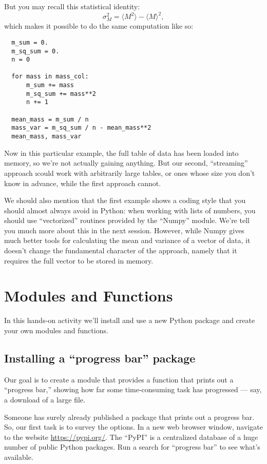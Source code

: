 \documentclass[letterpaper, 12pt, titlepage, twoside]{article}
\begin{document}
But you may recall this statistical identity:
\[
\sigma^2_M = \langle M^2\rangle - \langle M\rangle^2,
\]
which makes it possible to do the same computation like so:

\begin{lstlisting}
  m_sum = 0.
  m_sq_sum = 0.
  n = 0

  for mass in mass_col:
      m_sum += mass
      m_sq_sum += mass**2
      n += 1

  mean_mass = m_sum / n
  mass_var = m_sq_sum / n - mean_mass**2
  mean_mass, mass_var
\end{lstlisting}

Now in this particular example, the full table of data has been loaded into
memory, so we're not actually gaining anything. But our second, ``streaming''
approach \i{could} work with arbitrarily large tables, or ones whose size you
don't know in advance, while the first approach cannot.

We should also mention that the first example shows a coding style that you
should almost always avoid in Python: when working with lists of numbers, you
should use ``vectorized'' routines provided by the ``Numpy'' module. We're
tell you \i{much} more about this in the next session. However, while Numpy
gives much better tools for calculating the mean and variance of a vector of
data, it doesn't change the fundamental character of the approach, namely that
it requires the full vector to be stored in memory.


\newpage
\section{Modules and Functions}

In this hands-on activity we'll install and use a new Python package and
create your own modules and functions.

\subsection*{Installing a ``progress bar'' package}

Our goal is to create a module that provides a function that prints out a
``progress bar,'' showing how far some time-consuming task has progressed ---
say, a download of a large file.

Someone has surely already published a package that prints out a progress bar.
So, our first task is to survey the options. In a new web browser window,
navigate to the website \url{https://pypi.org/}. The ``PyPI'' is a centralized
database of a huge number of public Python packages. Run a search for
``progress bar'' to see what's available.
\end{document}
